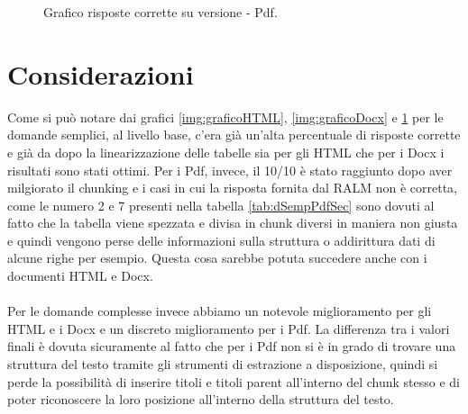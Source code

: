 \begin{figure}[H]
    
    \centering
    \caption{Grafico risposte corrette su versione - Pdf.}
    \label{img:graficoPdf}

\end{figure}

\section{Considerazioni}
Come si può notare dai grafici \ref{img:graficoHTML}, \ref{img:graficoDocx} e \ref{img:graficoPdf} per le domande semplici, al livello base, c'era già un'alta percentuale di risposte corrette e già da dopo la linearizzazione delle tabelle sia per gli HTML che per i Docx i risultati sono stati ottimi.
Per i Pdf, invece, il 10/10 è stato raggiunto dopo aver milgiorato il chunking e i casi in cui la risposta fornita dal RALM non è corretta, come le numero 2 e 7 presenti nella tabella \ref{tab:dSempPdfSec} sono dovuti al fatto che la tabella viene spezzata e divisa in chunk diversi in maniera non giusta e quindi vengono perse delle informazioni sulla struttura o addirittura dati di alcune righe per esempio.
Questa cosa sarebbe potuta succedere anche con i documenti HTML e Docx. 
\\\\
\noindent Per le domande complesse invece abbiamo un notevole miglioramento per gli HTML e i Docx e un discreto miglioramento per i Pdf.
La differenza tra i valori finali è dovuta sicuramente al fatto che per i Pdf non si è in grado di trovare una struttura del testo tramite gli strumenti di estrazione a disposizione, quindi si perde la possibilità di inserire titoli e titoli parent all'interno del chunk stesso e di poter riconoscere la loro posizione all'interno della struttura del testo.